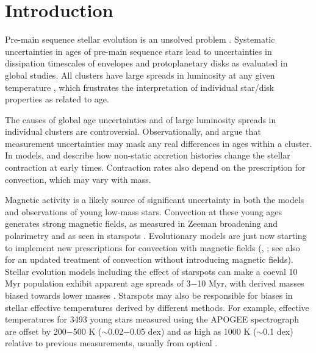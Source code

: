 \documentclass[twocolumn]{emulateapj}%
\begin{document}
\maketitle

\section{Introduction}\label{sec:intro}


Pre-main sequence stellar evolution is an unsolved problem \citep[see review by][]{soderblom14}.  Systematic uncertainties in ages of pre-main sequence stars lead to uncertainties in dissipation timescales of envelopes and protoplanetary disks as evaluated in global studies.  All clusters have large spreads in luminosity at any given temperature \citep[e.g.][]{reggiani11}, which frustrates the interpretation of individual star/disk properties as related to age.  

The causes of global age uncertainties and of large luminosity spreads in individual clusters are controversial.  Observationally, \citet{hartmann01} and \citet{slesnick08} argue that measurement uncertainties may mask any real differences in ages within a cluster.  In models, \citet{hartmann97} and \citet{baraffe09} describe how non-static accretion histories change the stellar contraction at early times.  Contraction rates also depend on the prescription for convection, which may vary with mass.

Magnetic activity is a likely source of significant uncertainty in both the models and observations of young low-mass stars. Convection at these young ages generates strong magnetic fields, as measured in Zeeman broadening and polarimetry \citep[e.g.][]{johnskrull07,donati09} and as seen in starspots \citep[e.g.][]{stauffer03,grankin08}.  Evolutionary models are just now starting to implement new prescriptions for convection with magnetic fields (\citet{somers15}, \citet{feiden16}; see also \citet{baraffe15} for an updated treatment of convection without introducing magnetic fields).  Stellar evolution models including the effect of starspots can make a coeval 10 Myr population exhibit apparent age spreads of 3$-$10 Myr, with derived masses biased towards lower masses \citep{somers15}.  Starspots may also be responsible for biases in stellar effective temperatures derived by different methods.  For example, effective temperatures for 3493 young stars measured using the APOGEE spectrograph \citep[$1.5-1.70 \;\mu$m at $R=22,500$][]{wilson10} are offset by 200$-$500 K ($\sim$0.02$-$0.05 dex) and as high as 1000 K ($\sim$0.1 dex) relative to previous measurements, usually from optical \citep{cottaar14}.  
\end{document}
